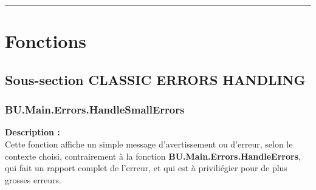 \documentclass[a4paper,10pt]{article}
\begin{document}

    \color{sec1}\par\noindent\rule{\textwidth}{0.4pt}\color{text}

    \color{sec1}
    \section{Fonctions}\color{text}

    \color{sec2}
    \subsection{Sous-section CLASSIC ERRORS HANDLING}\color{text}

    \color{sec3}
    \subsubsection{BU.Main.Errors.HandleSmallErrors}\color{text}

    \begin{justify}
        \textbf{Description :}\\
        Cette fonction affiche un simple message d'avertissement ou d'erreur, selon le contexte choisi, contrairement à la fonction \textbf{\color{func}BU.Main.Errors.HandleErrors}, qui fait un rapport complet de l'erreur, et qui est à priviliégier pour de plus grosses erreurs.
    \end{justify}
\end{document}
